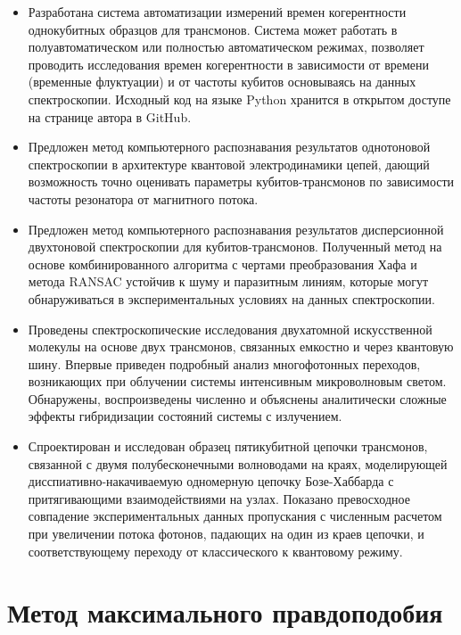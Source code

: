 \documentclass[14pt, a4paper]{extreport}
\renewcommand*\thesection{\arabic{section}}
\numberwithin{equation}{section}
\renewcommand*\thesection{\arabic{chapter}.\arabic{section}}
\begin{document}
\begin{itemize}
	\item Разработана система автоматизации измерений времен когерентности однокубитных образцов для трансмонов. Система может работать в полуавтоматическом или полностью автоматическом режимах, позволяет проводить исследования времен когерентности в зависимости от времени (временные флуктуации) и от частоты кубитов основываясь на данных спектроскопии. Исходный код на языке Python хранится в открытом доступе на странице автора в GitHub.
	\item Предложен метод компьютерного распознавания результатов однотоновой спектроскопии в архитектуре квантовой электродинамики цепей, дающий возможность точно оценивать параметры кубитов-трансмонов по зависимости частоты резонатора от магнитного потока.
	\item Предложен метод компьютерного распознавания результатов дисперсионной двухтоновой спектроскопии для кубитов-трансмонов. Полученный метод на основе комбинированного алгоритма с чертами преобразования Хафа и метода RANSAC устойчив к шуму и паразитным линиям, которые могут обнаруживаться в экспериментальных условиях на данных спектроскопии.
	\item Проведены спектроскопические исследования двухатомной искусственной молекулы на основе двух трансмонов, связанных емкостно и через квантовую шину. Впервые приведен подробный анализ многофотонных переходов, возникающих при облучении системы интенсивным микроволновым светом. Обнаружены, воспроизведены численно и объяснены аналитически сложные эффекты гибридизации состояний системы с излучением.
	\item Спроектирован и исследован образец пятикубитной цепочки трансмонов, связанной с двумя полубесконечными волноводами на краях, моделирующей дисспиативно-накачиваемую одномерную цепочку Бозе-Хаббарда с притягивающими взаимодействиями на узлах. Показано превосходное совпадение экспериментальных данных пропускания с численным расчетом при увеличении потока фотонов, падающих на один из краев цепочки, и соответствующему переходу от классического к квантовому режиму.
\end{itemize}


\appendix
\renewcommand*\thesection{\Alph{chapter}.\arabic{section}}
\chapter{Метод максимального правдоподобия}\label{sec:MLE}
\end{document}
